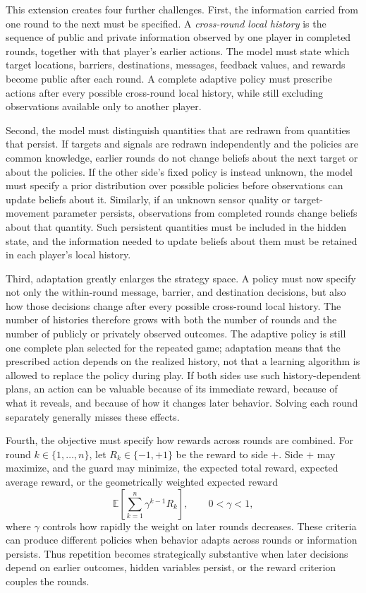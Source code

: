 This extension creates four further challenges. First, the information carried from one round to the next must be specified. A \emph{cross-round local history} is the sequence of public and private information observed by one player in completed rounds, together with that player's earlier actions. The model must state which target locations, barriers, destinations, messages, feedback values, and rewards become public after each round. A complete adaptive policy must prescribe actions after every possible cross-round local history, while still excluding observations available only to another player.

Second, the model must distinguish quantities that are redrawn from quantities that persist. If targets and signals are redrawn independently and the policies are common knowledge, earlier rounds do not change beliefs about the next target or about the policies. If the other side's fixed policy is instead unknown, the model must specify a prior distribution over possible policies before observations can update beliefs about it. Similarly, if an unknown sensor quality or target-movement parameter persists, observations from completed rounds change beliefs about that quantity. Such persistent quantities must be included in the hidden state, and the information needed to update beliefs about them must be retained in each player's local history.

Third, adaptation greatly enlarges the strategy space. A policy must now specify not only the within-round message, barrier, and destination decisions, but also how those decisions change after every possible cross-round local history. The number of histories therefore grows with both the number of rounds and the number of publicly or privately observed outcomes. The adaptive policy is still one complete plan selected for the repeated game; adaptation means that the prescribed action depends on the realized history, not that a learning algorithm is allowed to replace the policy during play. If both sides use such history-dependent plans, an action can be valuable because of its immediate reward, because of what it reveals, and because of how it changes later behavior. Solving each round separately generally misses these effects.

Fourth, the objective must specify how rewards across rounds are combined. For round $k\in\{1,\ldots,n\}$, let $R_k\in\{-1,+1\}$ be the reward to side $+$. Side $+$ may maximize, and the guard may minimize, the expected total reward, expected average reward, or the geometrically weighted expected reward
\[
    \mathbb{E}
    \left[
      \sum_{k=1}^n \gamma^{k-1}R_k
    \right],
    \qquad
    0<\gamma<1,
\]
where $\gamma$ controls how rapidly the weight on later rounds decreases. These criteria can produce different policies when behavior adapts across rounds or information persists. Thus repetition becomes strategically substantive when later decisions depend on earlier outcomes, hidden variables persist, or the reward criterion couples the rounds.

